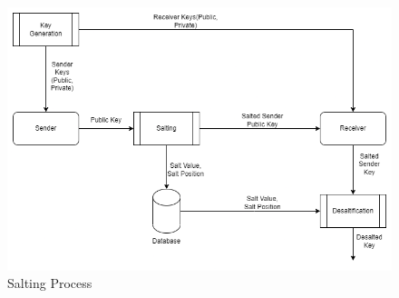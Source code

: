 \begin{figure}[H]
	\centering
	\includegraphics[width=160mm]{images/salting.png}{}
	\caption{Salting Process} %
	\label{Salting} %
\end{figure}


